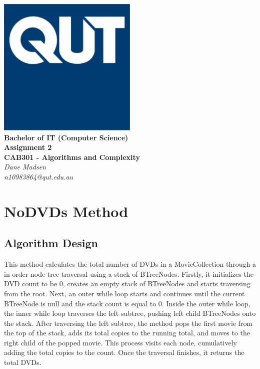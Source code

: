 \documentclass[12pt,a4paper]{article}
\begin{document}
	\begin{titlepage}
		
		\begin{center}
			\includegraphics[width=0.5\textwidth]{QUT.jpg}\\
			[0.03\textheight]  
			\Large\textbf{Bachelor of IT (Computer Science)}\\
			\Large\textbf{Assignment 2}\\
			\large\textbf{CAB301 - Algorithms and Complexity}\\
			[0.02\textheight]
			\large\textsl{Dane Madsen}\\
			\large\textsl{n10983864@qut.edu.au}
		\end{center}
		
	\end{titlepage}
	\tableofcontents
	\newpage
	
	\section{NoDVDs Method}
		\subsection{Algorithm Design}
			This method calculates the total number of DVDs in a MovieCollection 
			through a in-order node tree traversal using a stack of BTreeNodes. Firstly, 
			it initializes the DVD count to be 0, creates an empty stack of BTreeNodes 
			and starts traversing from the root. Next, an outer while loop starts and 
			continues until the current BTreeNode is null and the stack count is equal 
			to 0. Inside the outer while loop, the inner while loop traverses the left 
			subtree, pushing left child BTreeNodes onto the stack. After traversing the 
			left subtree, the method pops the first movie from the top of the stack, adds 
			its total copies to the running total, and moves to the right child of the popped 
			movie. This process visits each node, cumulatively adding the total copies to 
			the count. Once the traversal finishes, it returns the total DVDs.\\
		
\end{document}
